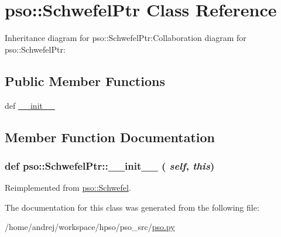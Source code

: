 \hypertarget{classpso_1_1SchwefelPtr}{
\section{pso::SchwefelPtr Class Reference}
\label{classpso_1_1SchwefelPtr}
}
Inheritance diagram for pso::SchwefelPtr:Collaboration diagram for pso::SchwefelPtr:\subsection*{Public Member Functions}
\begin{CompactItemize}
\item 
def \hyperlink{classpso_1_1SchwefelPtr_073a6a9bb2a9778745ac521f508634a0}{\_\-\_\-init\_\-\_\-}
\end{CompactItemize}


\subsection{Member Function Documentation}
\hypertarget{classpso_1_1SchwefelPtr_073a6a9bb2a9778745ac521f508634a0}{
\subsubsection{\setlength{\rightskip}{0pt plus 5cm}def pso::SchwefelPtr::\_\-\_\-init\_\-\_\- ( {\em self}, \/   {\em this})}}
\label{classpso_1_1SchwefelPtr_073a6a9bb2a9778745ac521f508634a0}




Reimplemented from \hyperlink{classpso_1_1Schwefel_923da07160f0471b0797a092dc53f05f}{pso::Schwefel}.

The documentation for this class was generated from the following file:\begin{CompactItemize}
\item 
/home/andrej/workspace/hpso/pso\_\-src/\hyperlink{pso_8py}{pso.py}\end{CompactItemize}
